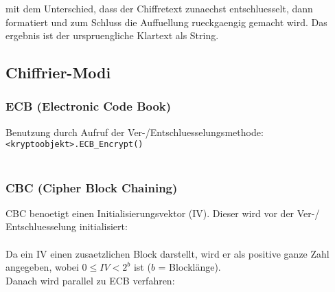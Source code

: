 mit dem Unterschied, dass der Chiffretext zunaechst entschluesselt,
dann formatiert und zum Schluss die Auffuellung rueckgaengig gemacht
wird. Das ergebnis ist der urspruengliche Klartext als String.


\subsection{Chiffrier-Modi}

\subsubsection{ECB (Electronic Code Book)}

Benutzung durch Aufruf der Ver-/Entschluesselungsmethode: \\
 
\texttt{<kryptoobjekt>.ECB\_Encrypt()} \\

 \\


\subsubsection{CBC (Cipher Block Chaining)}

CBC benoetigt einen Initialisierungsvektor (IV). Dieser wird vor 
der Ver-/ Entschluesselung initialisiert: \\

 \\

Da ein IV einen zusaetzlichen Block darstellt, wird er als positive
ganze Zahl angegeben, wobei $0 \leq IV < 2^b$
ist ($b$ = Blockl\"ange). \\

Danach wird parallel zu ECB verfahren: \\

 \\

 \\
